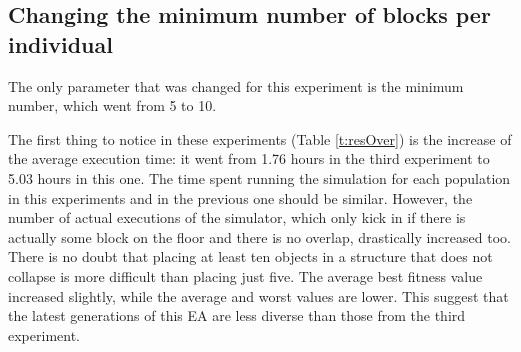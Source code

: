 \documentclass[runningheads,a4paper]{llncs}
\begin{document}
\begin{figure}[H]
	\centering
	\hfill
\end{figure}
\subsection{Changing the minimum number of blocks per individual}\label{E4}

The only parameter that was changed for this experiment is the minimum
number, which went from 5 to 10. 

The first thing to notice in these experiments (Table \ref{t:resOver}) is the 
increase of the average execution time: it went from 1.76 hours in the third 
experiment to 5.03 hours in this one. The time spent running the simulation for 
each population in this experiments and in the previous one should be similar. 
However, the number of actual executions of the simulator, which only
kick in if there is actually some block on the floor and there is no overlap, drastically increased too. There is no doubt 
that placing at least ten objects in a structure that does not
collapse is more difficult than placing just five. The average 
best fitness value increased slightly, while the average and worst values are lower. This suggest that the latest generations of this EA are less diverse than those 
from the third experiment.
\end{document}
